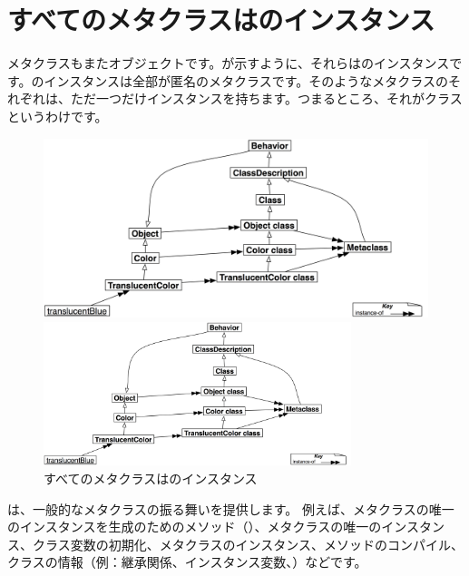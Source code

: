 \documentclass[a4paper,10pt,twoside]{book}
\begin{document}
\section{すべてのメタクラスはのインスタンス}

メタクラスもまたオブジェクトです。が示すように、それらはのインスタンスです。のインスタンスは全部が匿名のメタクラスです。そのようなメタクラスのそれぞれは、ただ一つだけインスタンスを持ちます。つまるところ、それがクラスというわけです。

\begin{center}
\begin{figure}
\ifluluelse
	{\centerline{\includegraphics[width=\textwidth]{TranslucentMetaclassClass}}}
	{\centerline{\includegraphics[width=0.8\textwidth]{TranslucentMetaclassClass}}}
\caption{すべてのメタクラスはのインスタンス}
\end{figure}
\end{center}

は、一般的なメタクラスの振る舞いを提供します。
例えば、メタクラスの唯一のインスタンスを生成のためのメソッド（）、メタクラスの唯一のインスタンス、クラス変数の初期化、メタクラスのインスタンス、メソッドのコンパイル、クラスの情報（例：継承関係、インスタンス変数、\etc）などです。
\end{document}
